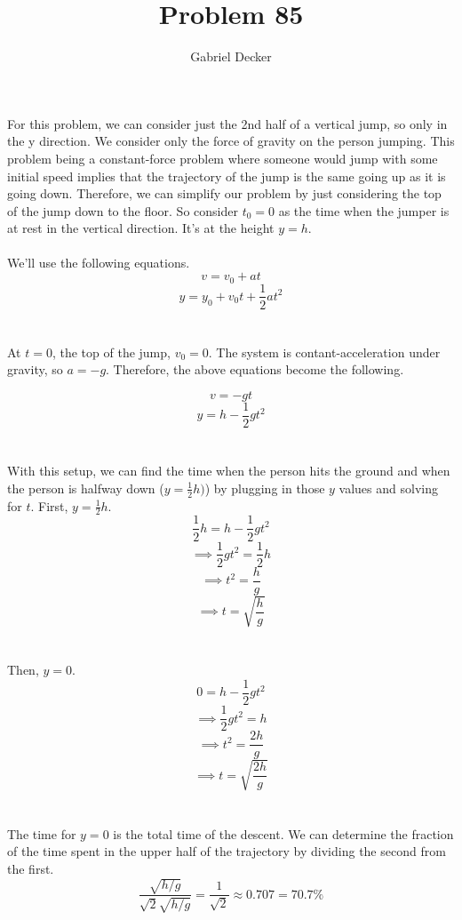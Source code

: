 \documentclass[12pt]{article}
\title{Problem 85}
\author{Gabriel Decker}
\begin{document}
\maketitle
\begin{flushleft}

For this problem, we can consider just the 2nd half of a vertical jump, so only in the y direction.
We consider only the force of gravity on the person jumping.
This problem being a constant-force problem where someone would jump with some initial speed implies that the trajectory of the jump is the same going up as it is going down.
Therefore, we can simplify our problem by just considering the top of the jump down to the floor.
So consider $t_0=0$ as the time when the jumper is at rest in the vertical direction.
It's at the height $y=h$.\\~\\

We'll use the following equations.
$$v=v_0+at$$
$$y=y_0+v_0t+\frac{1}{2}at^2$$\\~\\

At $t=0$, the top of the jump, $v_0=0$.
The system is contant-acceleration under gravity, so $a=-g$.
Therefore, the above equations become the following.

$$v=-gt$$
$$y=h-\frac{1}{2}gt^2$$\\~\\

With this setup, we can find the time when the person hits the ground and when the person is halfway down ($y=\frac{1}{2}h)$) by plugging in those $y$ values and solving for $t$.
First, $y=\frac{1}{2}h$.
$$\frac{1}{2}h=h-\frac{1}{2}gt^2$$
$$\implies \frac{1}{2}gt^2=\frac{1}{2}h$$
$$\implies t^2=\frac{h}{g}$$
$$\implies t=\sqrt{\frac{h}{g}}$$\\~\\

Then, $y=0$.
$$0=h-\frac{1}{2}gt^2$$
$$\implies \frac{1}{2}gt^2=h$$
$$\implies t^2=\frac{2h}{g}$$
$$\implies t=\sqrt{\frac{2h}{g}}$$\\~\\

The time for $y=0$ is the total time of the descent.
We can determine the fraction of the time spent in the upper half of the trajectory by dividing the second from the first.
$$\frac{\sqrt{h/g}}{\sqrt{2}\sqrt{h/g}}=\frac{1}{\sqrt{2}}\approx0.707=70.7\%$$

\end{flushleft}
\end{document}
